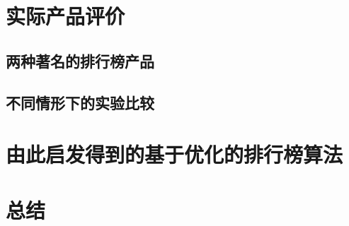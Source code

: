 \documentclass[UTF8]{ctexart}
\theoremstyle{plain}
\theoremstyle{definition}
\theoremstyle{remark}
\begin{document}
	\section{实际产品评价}
	\subsection{两种著名的排行榜产品}
	\subsection{不同情形下的实验比较}
	\section{由此启发得到的基于优化的排行榜算法}
	\section{总结}
	
	
	\newpage
	\appendix
\end{document}
